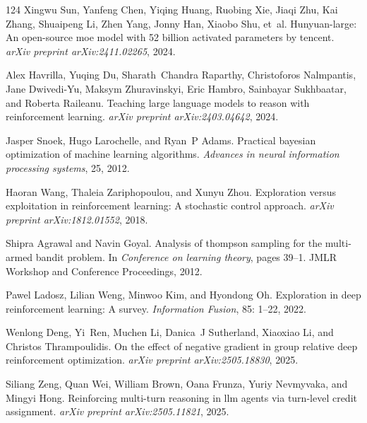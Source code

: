 \documentclass[]{youtu} %
\begin{document}
\begin{thebibliography}{124}
Xingwu Sun, Yanfeng Chen, Yiqing Huang, Ruobing Xie, Jiaqi Zhu, Kai Zhang, Shuaipeng Li, Zhen Yang, Jonny Han, Xiaobo Shu, et~al.
\newblock Hunyuan-large: An open-source moe model with 52 billion activated parameters by tencent.
\newblock \emph{arXiv preprint arXiv:2411.02265}, 2024.

Alex Havrilla, Yuqing Du, Sharath~Chandra Raparthy, Christoforos Nalmpantis, Jane Dwivedi-Yu, Maksym Zhuravinskyi, Eric Hambro, Sainbayar Sukhbaatar, and Roberta Raileanu.
\newblock Teaching large language models to reason with reinforcement learning.
\newblock \emph{arXiv preprint arXiv:2403.04642}, 2024.

Jasper Snoek, Hugo Larochelle, and Ryan~P Adams.
\newblock Practical bayesian optimization of machine learning algorithms.
\newblock \emph{Advances in neural information processing systems}, 25, 2012.

Haoran Wang, Thaleia Zariphopoulou, and Xunyu Zhou.
\newblock Exploration versus exploitation in reinforcement learning: A stochastic control approach.
\newblock \emph{arXiv preprint arXiv:1812.01552}, 2018.

Shipra Agrawal and Navin Goyal.
\newblock Analysis of thompson sampling for the multi-armed bandit problem.
\newblock In \emph{Conference on learning theory}, pages 39--1. JMLR Workshop and Conference Proceedings, 2012.

Pawel Ladosz, Lilian Weng, Minwoo Kim, and Hyondong Oh.
\newblock Exploration in deep reinforcement learning: A survey.
\newblock \emph{Information Fusion}, 85: 1--22, 2022.

Wenlong Deng, Yi~Ren, Muchen Li, Danica~J Sutherland, Xiaoxiao Li, and Christos Thrampoulidis.
\newblock On the effect of negative gradient in group relative deep reinforcement optimization.
\newblock \emph{arXiv preprint arXiv:2505.18830}, 2025.

Siliang Zeng, Quan Wei, William Brown, Oana Frunza, Yuriy Nevmyvaka, and Mingyi Hong.
\newblock Reinforcing multi-turn reasoning in llm agents via turn-level credit assignment.
\newblock \emph{arXiv preprint arXiv:2505.11821}, 2025.


\end{thebibliography}
\end{document}
